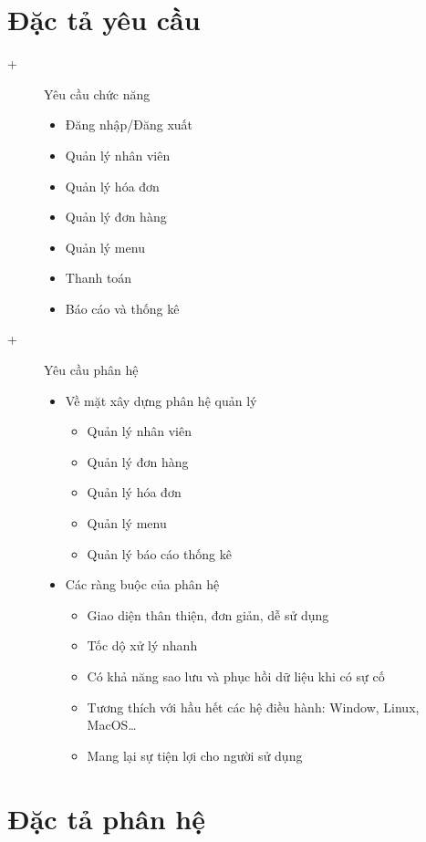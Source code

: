 \documentclass{report}
\begin{document}
\section{Đặc tả yêu cầu}
\fontsize{13}{15}\selectfont
\begin{description}
\item[+] {Yêu cầu chức năng}
    \begin{itemize}
        \item Đăng nhập/Đăng xuất
        \item Quản lý nhân viên
        \item Quản lý hóa đơn
        \item Quản lý đơn hàng
        \item Quản lý menu
        \item Thanh toán
        \item Báo cáo và thống kê
    \end{itemize}
\item[+] {Yêu cầu phân hệ}
 \begin{itemize}
        \item Về mặt xây dựng phân hệ quản lý
         \begin{itemize}
            \item Quản lý nhân viên
            \item Quản lý đơn hàng
            \item Quản lý hóa đơn 
            \item Quản lý menu
            \item Quản lý báo cáo thống kê
        \end{itemize}
        
        \item Các ràng buộc của phân hệ
        \begin{itemize}
            \item Giao diện thân thiện, đơn giản, dễ sử dụng
            \item Tốc dộ xử lý nhanh
            \item Có khả năng sao lưu và phục hồi dữ liệu khi có sự cố
            \item Tương thích với hầu hết các hệ điều hành: Window, Linux, MacOS…
            \item Mang lại sự tiện lợi cho người sử dụng
        \end{itemize}
    \end{itemize}
\end{description}
\section{Đặc tả phân hệ}
\fontsize{13}{15}\selectfont
\end{document}
